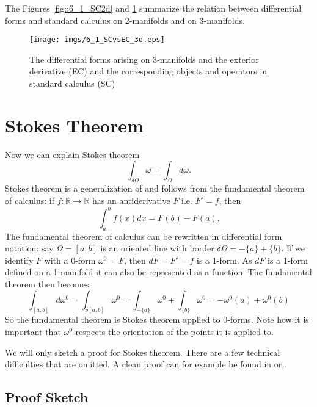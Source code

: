 The Figures \ref{fig::6_1_SC2d} and  \ref{fig::6_1_SC3d} summarize the relation between differential forms and standard calculus on 2-manifolds and  on 3-manifolds.


\begin{figure}
\begin{center}
\texttt{[image: imgs/6\_1\_SCvsEC\_3d.eps]}
\end{center}
\caption{The differential forms arising on 3-manifolds and the exterior derivative (EC) and the corresponding objects and operators in standard calculus (SC)}
\label{fig::6_1_SC3d}
\end{figure}


\section{Stokes Theorem}
\label{sec:EC_stokes}

Now we can explain Stokes theorem
\[\int_{\delta\Omega} \omega = \int_{\Omega} d \omega.\]
Stokes theorem is a generalization of and follows from the fundamental theorem of calculus: if $f:\mathbb R \to \mathbb R $ has an antiderivative $F$ i.e. $F' = f$, then
\[\int_a^b f(x) dx = F(b) - F(a).\]
The fundamental theorem of calculus can be rewritten in differential form notation: say $\Omega = [a,b]$ is an oriented line with border $\delta \Omega = -\{a\} + \{b\}$. If we identify $F$ with a 0-form $\omega^0 = F$, then $d F = F' =f$ is a 1-form. As $dF$ is a 1-form defined on a 1-manifold it can also be represented as a function. The fundamental theorem then becomes:
\[\int_{[a,b]} d\omega^0 = \int_{\delta [a,b]} \omega^0 = \int_{-\{a\}}\omega^0 + \int_{\{b\}} \omega^0 = -\omega^0(a) + \omega^0(b)\]
So the fundamental theorem is Stokes theorem applied to $0$-forms. Note how it is important that $\omega^0$ respects the orientation of the points it is applied to.

We will only sketch a proof for Stokes theorem. 
There are a few technical difficulties that are omitted. A clean proof can for example be found in \cite{globalAnalysis} or \cite{FRANKEL11}.

\subsection{Proof Sketch}

